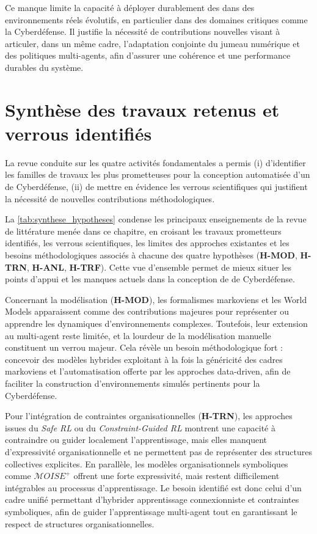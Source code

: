 Ce manque limite la capacité à déployer durablement des  dans des environnements réels évolutifs, en particulier dans des domaines critiques comme la Cyberdéfense. Il justifie la nécessité de contributions nouvelles visant à articuler, dans un même cadre, l'adaptation conjointe du jumeau numérique et des politiques multi-agents, afin d'assurer une cohérence et une performance durables du système.


\section*{Synthèse des travaux retenus et verrous identifiés}

La revue conduite sur les quatre activités fondamentales a permis
(i) d'identifier les familles de travaux les plus prometteuses pour la conception automatisée d'un  de Cyberdéfense,
(ii) de mettre en évidence les verrous scientifiques qui justifient la nécessité de nouvelles contributions méthodologiques.

\noindent
La \autoref{tab:synthese_hypotheses} condense les principaux enseignements de la revue de littérature menée dans ce chapitre, en croisant les travaux prometteurs identifiés, les verrous scientifiques, les limites des approches existantes et les besoins méthodologiques associés à chacune des quatre hypothèses (\textbf{H-MOD}, \textbf{H-TRN}, \textbf{H-ANL}, \textbf{H-TRF}). Cette vue d'ensemble permet de mieux situer les points d'appui et les manques actuels dans la conception de  de Cyberdéfense.

Concernant la modélisation (\textbf{H-MOD}), les formalismes markoviens et les World Models apparaissent comme des contributions majeures pour représenter ou apprendre les dynamiques d'environnements complexes. Toutefois, leur extension au multi-agent reste limitée, et la lourdeur de la modélisation manuelle constituent un verrou majeur. Cela révèle un besoin méthodologique fort : concevoir des modèles hybrides exploitant à la fois la généricité des cadres markoviens et l'automatisation offerte par les approches data-driven, afin de faciliter la construction d'environnements simulés pertinents pour la Cyberdéfense.

Pour l'intégration de contraintes organisationnelles (\textbf{H-TRN}), les approches issues du \textit{Safe RL} ou du \textit{Constraint-Guided RL} montrent une capacité à contraindre ou guider localement l'apprentissage, mais elles manquent d'expressivité organisationnelle et ne permettent pas de représenter des structures collectives explicites. En parallèle, les modèles organisationnels symboliques comme $\mathcal{M}OISE^+$ offrent une forte expressivité, mais restent difficilement intégrables au processus d'apprentissage. Le besoin identifié est donc celui d'un cadre unifié permettant d'hybrider apprentissage connexionniste et contraintes symboliques, afin de guider l'apprentissage multi-agent tout en garantissant le respect de structures organisationnelles.

